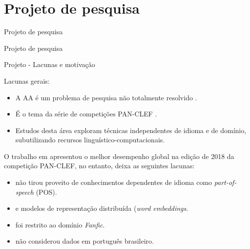 \section{Projeto de pesquisa}

\begin{frame}{Projeto de pesquisa}
	\begin{alertblock}{Projeto de pesquisa }
	\end{alertblock}
\end{frame}


\begin{frame}{Projeto - Lacunas e motivação}

Lacunas gerais:

\begin{itemize}
	\item A AA é um problema de pesquisa não totalmente resolvido \cite{Potthast2017}.
	\item É o tema da série de competições PAN-CLEF \cite{aa-overview-2018} \cite{Kocher2017Verificacao,Koppel2018_pseud,Varela2016}.
	\item Estudos desta área exploram técnicas independentes de idioma e de domínio, subutilizando  recursos linguístico-computacionais.
\end{itemize}

O trabalho em  apresentou o melhor desempenho global na edição de 2018 da competição PAN-CLEF, no entanto, deixa as seguintes lacunas:
\begin{itemize}
	\item não tirou proveito de conhecimentos dependentes de idioma como {\it part-of-speech} (POS).
	\item e modelos de representação distribuída ({\it word embeddings}.
	\item foi restrito ao domínio {\it Fanfic}.
	\item não considerou dados em português brasileiro.
\end{itemize}

\end{frame}


